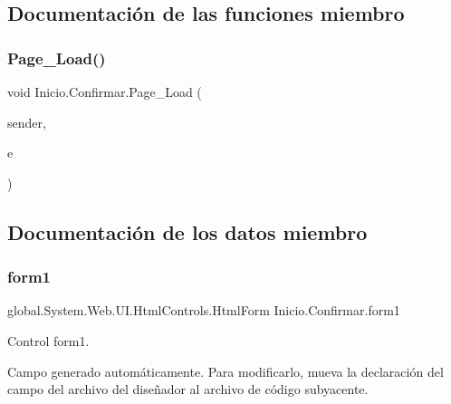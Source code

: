 \subsection{Documentación de las funciones miembro}
\mbox{\label{classInicio_1_1Confirmar_a47f2d7d6e91b4e672a1b954710c65daf}} 
\subsubsection{\texorpdfstring{Page\_Load()}{Page\_Load()}}
{\footnotesize\ttfamily void Inicio.\+Confirmar.\+Page\+\_\+\+Load (\begin{DoxyParamCaption}\item[{object}]{sender,  }\item[{Event\+Args}]{e }\end{DoxyParamCaption})\hspace{0.3cm}{\ttfamily [protected]}}



\subsection{Documentación de los datos miembro}
\mbox{\label{classInicio_1_1Confirmar_a30f1390871512f4d2eb2a6e5a635f9f5}} 
\subsubsection{\texorpdfstring{form1}{form1}}
{\footnotesize\ttfamily global.\+System.\+Web.\+U\+I.\+Html\+Controls.\+Html\+Form Inicio.\+Confirmar.\+form1\hspace{0.3cm}{\ttfamily [protected]}}



Control form1. 

Campo generado automáticamente. Para modificarlo, mueva la declaración del campo del archivo del diseñador al archivo de código subyacente. \mbox{\label{classInicio_1_1Confirmar_aa4a4ab67f1e6964cdc3e83eb66293fa9}} 
